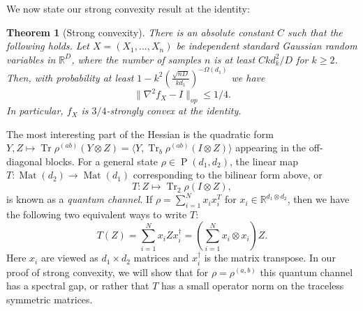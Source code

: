 \documentclass[aos]{imsart}
\newtheorem{theorem}{Theorem}
\theoremstyle{definition}
\DeclareMathOperator{\poly}{poly}
\DeclareMathOperator{\mat}{Mat}
\DeclareMathOperator{\tr}{Tr}
\DeclarePairedDelimiter{\norm}{\lVert}{\rVert}
\newcommand{\R}{{\mathbb{R}}}
\newcommand{\ot}{\otimes}
\newcommand{\eps}{\varepsilon}
\newcommand{\PD}{\operatorname{P}}
\newcommand{\samp}{x}
\newcommand{\rv}{X}
\newcommand{\CF}[1]{{\color{purple}[CF: #1]}}
\newcommand{\MW}[1]{{\color{red}[MW: #1]}}
\newcommand{\TODO}[1]{{\color{blue}[TODO: #1]}}
\begin{document}







We now state our strong convexity result at the identity:


\begin{theorem}[Strong convexity]\label{thm:tensor-convexity} There is an absolute constant $C$ such that the following holds. Let $\rv = (\rv_1,\dots,\rv_n)$ be independent standard Gaussian random variables in $\R^D$, where the number of samples $n$ is at least $C k d_k^2/D$ for $k \geq 2$. Then, with probability at least $1 - k^2 \left(\frac {\sqrt{nD}}{kd_1}\right)^{ - \Omega(d_1)}$ we have
$$ \|\nabla^{2} f_{\rv} - I\|_{op} \leq 1/4.$$
In particular, $f_{\rv}$ is $3/4$-strongly convex at the identity.
\end{theorem}



The most interesting part of the Hessian is the quadratic form $Y,Z \mapsto \tr \rho^{(ab)} \left( Y \ot Z \right) = \langle Y, \tr_b \rho^{(ab)} \left(I \ot Z\right) \rangle$ appearing in the off-diagonal blocks. For a general state $\rho \in \PD(d_1, d_2)$, the linear map $T:\mat(d_2) \to \mat(d_1)$ corresponding to the bilinear form above, or
$$T: Z \mapsto \tr_2 \rho \left(I \ot Z\right),$$
 is known as a \emph{quantum channel}. If $\rho = \sum_{i = 1}^N x_i x_i^T$ for $x_i \in \R^{d_1 \ot d_2}$, then we have the following two equivalent ways to write $T$:
$$ T(Z) = \sum_{i = 1}^N x_i Z x_i^\dagger = \left(\sum_{i = 1}^N x_i \ot x_i\right) Z.$$
Here $x_i$ are viewed as $d_1 \times d_2$ matrices and $x_i^\dagger$ is the matrix transpose. In our proof of strong convexity, we will show that for $\rho = \rho^{(a,b)}$ this quantum channel has a spectral gap, or rather that $T$ has a small operator norm on the traceless symmetric matrices.
\end{document}
